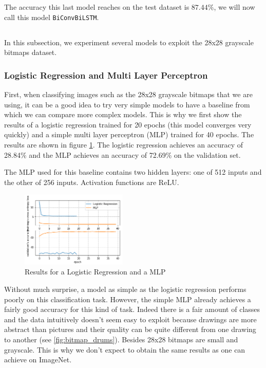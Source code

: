 \documentclass[10pt,twocolumn,letterpaper]{article}
\begin{document}
The accuracy this last model reaches on the test dataset is $87.44\%$, we will now call this model \texttt{BiConvBiLSTM}.

\subsection{\cnnTitle{}}

In this subsection, we experiment several models to exploit the 28x28 grayscale bitmaps dataset.

\subsubsection{Logistic Regression and Multi Layer Perceptron}

First, when classifying images such as the 28x28 grayscale bitmaps that we are using, it can be a good idea to try very simple models to have a baseline from which we can compare more complex models. This is why we first show the results of a logistic regression trained for 20 epochs (this model converges very quickly) and a simple multi layer perceptron (MLP) trained for 40 epochs. The results are shown in figure \ref{fig:mlp_logistic}. The logistic regression achieves an accuracy of 28.84\% and the MLP achieves an accuracy of 72.69\% on the validation set.

The MLP used for this baseline contains two hidden layers: one of 512 inputs and the other of 256 inputs. Activation functions are ReLU.

\begin{figure}[h] 
\centering
\includegraphics[width=0.45\textwidth]{images/bitmaps_mlp.png}
\caption{Results for a Logistic Regression and a MLP}
\label{fig:mlp_logistic}
\end{figure}

Without much surprise, a model as simple as the logistic regression performs poorly on this classification task. However, the simple MLP already achieves a fairly good accuracy for this kind of task. Indeed there is a fair amount of classes and the data intuitively doesn't seem easy to exploit because drawings are more abstract than pictures and their quality can be quite different from one drawing to another (see \ref{fig:bitmap_drums}). Besides 28x28 bitmaps are small and grayscale. This is why we don't expect to obtain the same results as one can achieve on ImageNet.
\end{document}
